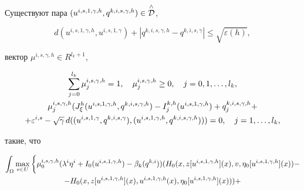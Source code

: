 \begin{thms}\label{9t1}


Существуют пара $(u^{i,s,1,\gamma,h},q^{k,i,s,\gamma,h})\in


\up{\wedge}{\cal D}$,


\begin{equation}\label{9dis1_6}


d(u^{i,s,1,\gamma,h},u^{i,s,1,\gamma})+


|q^{k,i,s,\gamma,h}-q^{k,i,s,\gamma}|\leq\sqrt{\varepsilon(h)},


\end{equation}


вектор $\mu^{i,s,\gamma,h}\in R^{l_k+1}$,


\begin{gather}\label{9dis1_7}


\sum_{j=0}^{l_k}\mu_j^{i,s,\gamma,h}=1,\quad


\mu^{i,s,\gamma,h}_j\geq 0,\quad j=0,1,\dotsc,l_k, \\


%


\mu^{i,s,\gamma,h}_j(J_\xi^h(u^{i,s,1,\gamma,h},q^{k,i,s,\gamma,h})-


I_j^{k,h}(u^{i,s,1,\gamma,h})+q_j^{k,i,s,\gamma,h}+\notag \\


%


+\varepsilon^{i,s}- \sqrt\gamma\,


{d}((u^{i,s,1,\gamma},q^{k,i,s,\gamma}),


(u^{i,s,1,\gamma,h},q^{k,i,s,\gamma,h})))=0,


\quad j=1,\dotsc,l_k,\notag


\end{gather}


такие, что


\begin{gather}


\int_\Omega\max_{v\in U}


\bigg\{\mu^{i,s,\gamma,h}_0(\lambda^i\eta^i+I_0(u^{i,s,1,\gamma,h})-


\beta_k(q^{k,i}))(H_0(x,z[u^{i,s,1,\gamma,h}](x),v,


\eta_0[u^{i,s,1,\gamma,h}](x))- \notag\\


%


- H_0(x,z[u^{i,s,1,\gamma,h}](x),u^{i,s,1,\gamma,h}(x),


\eta_0[u^{i,s,1,\gamma,h}](x)))+ \notag \\



\end{gather}
\end{thms}

